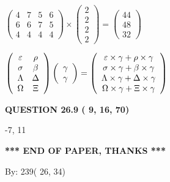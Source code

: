 \documentclass[12pt]{article}
\begin{document}
 
$\left( \begin{array}{ccccccccccccccc}
           4 & 
           7 & 
           5 & 
           6 \\ 
           6 & 
           6 & 
           7 & 
           5 \\ 
           4 & 
           4 & 
           4 & 
           4
\end{array}\right) \times
\left( \begin{array}{c}
           2 \\ 
           2 \\ 
           2 \\ 
           2
\end{array}\right)  =
\left( \begin{array}{c}
          44 \\ 
          48 \\ 
          32
\end{array}\right)  $
 
$  %
 \left( \begin{array}
 {
 c
 c
 }
 \varepsilon & 
 \rho \\ 
 \sigma & 
 \beta \\ 
 \Lambda & 
 \Delta \\ 
 \Omega & 
                    \Xi
 \end{array} \right)
 \left( \begin{array}
 {
 c
 }
 \gamma \\ 
 \gamma
 \end{array} \right)
=
  \left( \begin{array}
 {
 c
 }
 \varepsilon \times  \gamma   +  \rho \times  \gamma \\ 
 \sigma \times  \gamma   +  \beta \times  \gamma \\ 
 \Lambda \times  \gamma   +  \Delta \times  \gamma \\ 
 \Omega \times  \gamma   +                     \Xi \times  \gamma
 \end{array} \right)
$
 
  
  
{\textbf{\large{QUESTION
26.9 
 (          9,         16,         70)
}}}

-7,  %
11
 
   
   
   
   
\vspace{1.0in} 
{\textbf{\large{ *** END OF PAPER, THANKS *** }}} 
   
   
\hspace{1.0in} By: 
         239(         26,          34)
   
\end{document}
